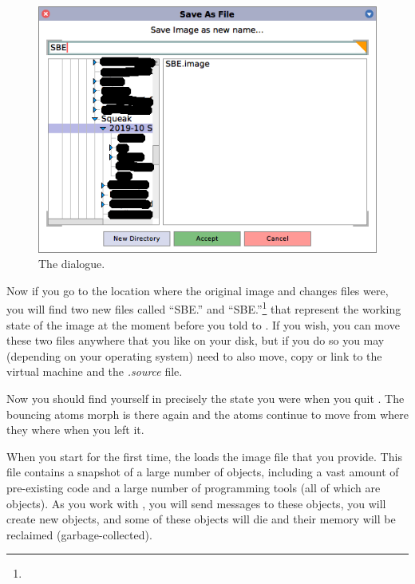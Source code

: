 \documentclass[a4paper,10pt,twoside]{book}
\begin{document}
\begin{figure}[htb]
\begin{minipage}[b]{0.48\textwidth}
	{\centerline {\includegraphics[scale=0.7]{saveAs}}}
	\caption{The  dialogue.\label{fig:saveas}}
\end{minipage}
\end{figure}


Now if you go to the location where the original image and changes files were, you will find two new files called ``SBE.'' and ``SBE.''\footnote{} that represent the working state of the \sq image at the moment before you told \sq to .
If you wish, you can move these two files anywhere that you like on your disk, but if you do so you may (depending on your operating system) need to also move, copy or link to the virtual machine and the \emph{.source} file.


Now you should find yourself in precisely the state you were when you quit \sq. The bouncing atoms morph is there again and the atoms continue to move from where they where when you left it.

When you start \sq for the first time, the \sq {} loads the image file that you provide. This file contains a snapshot of a large number of objects, including a vast amount of pre-existing code and a large number of programming tools (all of which are objects). As you work with \sq, you will send messages to these objects, you will create new objects, and some of these objects will die and their memory will be reclaimed (\ie garbage-collected).
\end{document}
